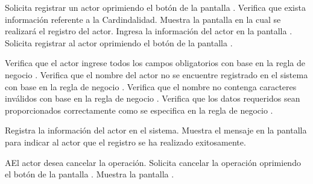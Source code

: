  \begin{UCtrayectoria}
    \UCpaso[\UCactor] Solicita registrar un actor oprimiendo el botón  de la pantalla .
    \UCpaso[\UCsist] Verifica que exista información referente a la Cardindalidad. 
    \UCpaso[\UCsist] Muestra la pantalla  en la cual se realizará el registro del actor. 
    \UCpaso[\UCactor] Ingresa la información del actor en la pantalla . \label{cu7.1:ingresaDatos}
    \UCpaso[\UCactor] Solicita registrar al actor oprimiendo el botón  de la pantalla . 
    
    \UCpaso[\UCsist] Verifica que el actor ingrese todos los campos obligatorios con base en la regla de negocio  . 
    \UCpaso[\UCsist] Verifica que el nombre del actor no se encuentre registrado en el sistema con base en la regla de negocio  . 
    \UCpaso[\UCsist] Verifica que el nombre no contenga caracteres inválidos con base en la regla de negocio . 
    \UCpaso[\UCsist] Verifica que los datos requeridos sean proporcionados correctamente como se especifica en la regla de negocio .  
    
    \UCpaso[\UCsist] Registra la información del actor en el sistema.
    \UCpaso[\UCsist] Muestra el mensaje  en la pantalla  
    para indicar al actor que el registro se ha realizado exitosamente.
 \end{UCtrayectoria}
 \begin{UCtrayectoriaA}{A}{El actor desea cancelar la operación.}
    \UCpaso[\UCactor] Solicita cancelar la operación oprimiendo el botón  de la pantalla .
    \UCpaso[\UCsist] Muestra la pantalla .
 \end{UCtrayectoriaA}

